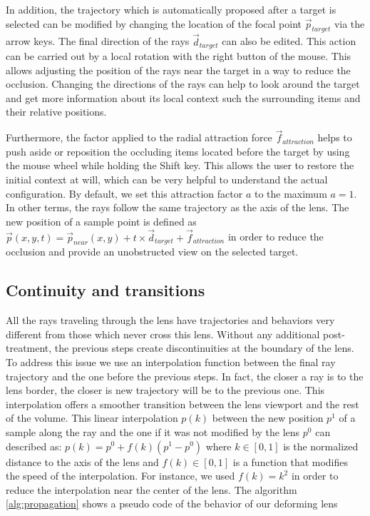 In addition, the trajectory which is automatically proposed after a target is selected can be modified by changing the location of the focal point $\vec{p}_{target}$ via the arrow keys. The final direction of the rays $\vec{d}_{target}$ can also be edited. This action can be carried out by a local rotation with the right button of the mouse. This allows adjusting the position of the rays near the target in a way to reduce the occlusion. Changing the directions of the rays can help to look around the target and get more information about its local context such the surrounding items and their relative positions.  

Furthermore, the factor applied to the radial attraction force $\vec{f}_{attraction}$  helps to push aside or reposition the occluding items located before the target by using the mouse wheel while holding the Shift key. This allows the user to restore the initial context at will, which can be very helpful to understand the actual configuration. By default, we set this attraction factor $a$ to the maximum $a=1$. In other terms, the rays follow the same trajectory as the axis of the lens. The new position of a sample point is defined as $\vec{p}\left(x,y,t\right) = \vec{p}_{near}\left(x,y\right) + t \times \vec{d}_{target} + \vec{f}_{attraction} $  in order to reduce the occlusion and provide an unobstructed view  on the selected target.

\subsection{Continuity and transitions}\label{continuity}

All the rays traveling through the lens have trajectories and behaviors very different from those which never cross this lens. Without any additional post-treatment, the previous steps create discontinuities at the boundary of the lens. To address this issue we use an interpolation function between the final ray trajectory and the one before the previous steps. In fact, the closer a ray is to the lens border, the closer is new trajectory will be to the previous one. This interpolation offers a smoother transition between the lens viewport and the rest of the volume. This linear interpolation $p\left(k\right)$ between the new position $p^{1}$ of a sample along the ray and the one if it was not modified by the lens $p^{0}$ can described as: $p\left(k\right) = p^{0} + f\left(k\right)\left( p^{1} - p^{0} \right)$ where $k \in  \left[0,1\right]$  is the normalized distance to the axis of the lens and $ f\left(k\right)\in  \left[0,1\right]$ is a function that modifies the speed of the interpolation. For instance, we used $ f\left(k\right) = k^2$ in order to reduce the interpolation near the center of the lens.
The algorithm \ref{alg:propagation} shows a pseudo code of the behavior of our deforming lens 


